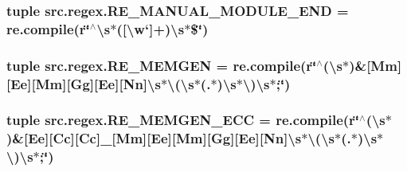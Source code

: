 \hypertarget{namespacesrc_1_1regex_aa69fbaf097f82d033074ca123d08b1c6}{
\subsubsection[{R\-E\-\_\-\-M\-A\-N\-U\-A\-L\-\_\-\-M\-O\-D\-U\-L\-E\-\_\-\-E\-N\-D}]{\setlength{\rightskip}{0pt plus 5cm}tuple src.\-regex.\-R\-E\-\_\-\-M\-A\-N\-U\-A\-L\-\_\-\-M\-O\-D\-U\-L\-E\-\_\-\-E\-N\-D = re.\-compile(r\char`\"{}$^\wedge$\textbackslash{}s$\ast$(\mbox{[}\textbackslash{}w`\mbox{]}+)\textbackslash{}s$\ast$\$\char`\"{})}}\label{namespacesrc_1_1regex_aa69fbaf097f82d033074ca123d08b1c6}
\hypertarget{namespacesrc_1_1regex_ae12e0f2f559392f1cc4e496864f63772}{
\subsubsection[{R\-E\-\_\-\-M\-E\-M\-G\-E\-N}]{\setlength{\rightskip}{0pt plus 5cm}tuple src.\-regex.\-R\-E\-\_\-\-M\-E\-M\-G\-E\-N = re.\-compile(r\char`\"{}$^\wedge$(\textbackslash{}s$\ast$)\&\mbox{[}Mm\mbox{]}\mbox{[}Ee\mbox{]}\mbox{[}Mm\mbox{]}\mbox{[}Gg\mbox{]}\mbox{[}Ee\mbox{]}\mbox{[}Nn\mbox{]}\textbackslash{}s$\ast$\textbackslash{}(\textbackslash{}s$\ast$(.$\ast$)\textbackslash{}s$\ast$\textbackslash{})\textbackslash{}s$\ast$;\char`\"{})}}\label{namespacesrc_1_1regex_ae12e0f2f559392f1cc4e496864f63772}
\hypertarget{namespacesrc_1_1regex_a156ab883a721d2a446faefaf9620953b}{
\subsubsection[{R\-E\-\_\-\-M\-E\-M\-G\-E\-N\-\_\-\-E\-C\-C}]{\setlength{\rightskip}{0pt plus 5cm}tuple src.\-regex.\-R\-E\-\_\-\-M\-E\-M\-G\-E\-N\-\_\-\-E\-C\-C = re.\-compile(r\char`\"{}$^\wedge$(\textbackslash{}s$\ast$)\&\mbox{[}Ee\mbox{]}\mbox{[}Cc\mbox{]}\mbox{[}Cc\mbox{]}\-\_\-\mbox{[}Mm\mbox{]}\mbox{[}Ee\mbox{]}\mbox{[}Mm\mbox{]}\mbox{[}Gg\mbox{]}\mbox{[}Ee\mbox{]}\mbox{[}Nn\mbox{]}\textbackslash{}s$\ast$\textbackslash{}(\textbackslash{}s$\ast$(.$\ast$)\textbackslash{}s$\ast$\textbackslash{})\textbackslash{}s$\ast$;\char`\"{})}}\label{namespacesrc_1_1regex_a156ab883a721d2a446faefaf9620953b}
